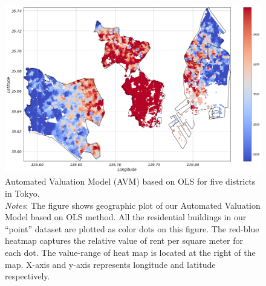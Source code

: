 \documentclass[a4paper, 12pt]{article} %
\begin{document}
\newpage
\begin{landscape}
\begin{figure}
\centering
\includegraphics[scale=0.5]{ols.png}
\caption{Automated Valuation Model (AVM) based on OLS for five districts in Tokyo. \\
\textit{Notes}: The figure shows geographic plot of our Automated Valuation Model based on OLS method. All the residential buildings in our “point” dataset are plotted as color dots on this figure. The red-blue heatmap captures the relative value of rent per square meter for each dot. The value-range of heat map is located at the right of the map. X-axis and y-axis represents longitude and latitude respectively. 
} 
\label{fig6}
\end{figure}
\end{landscape}
\end{document}
